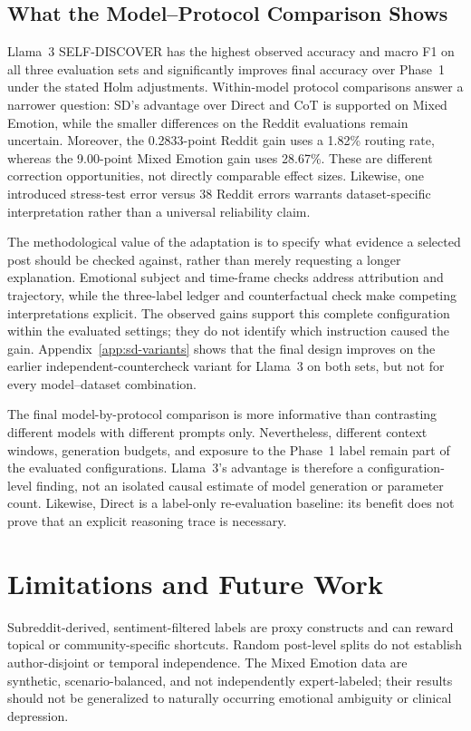 \documentclass{ieeeaccess}
\begin{document}
\subsection{What the Model--Protocol Comparison Shows}
Llama~3 SELF-DISCOVER has the highest observed accuracy and macro F1 on all three evaluation sets and significantly improves final accuracy over Phase~1 under the stated Holm adjustments. Within-model protocol comparisons answer a narrower question: SD's advantage over Direct and CoT is supported on Mixed Emotion, while the smaller differences on the Reddit evaluations remain uncertain. Moreover, the 0.2833-point Reddit gain uses a 1.82\% routing rate, whereas the 9.00-point Mixed Emotion gain uses 28.67\%. These are different correction opportunities, not directly comparable effect sizes. Likewise, one introduced stress-test error versus 38 Reddit errors warrants dataset-specific interpretation rather than a universal reliability claim.

The methodological value of the adaptation is to specify what evidence a selected post should be checked against, rather than merely requesting a longer explanation. Emotional subject and time-frame checks address attribution and trajectory, while the three-label ledger and counterfactual check make competing interpretations explicit. The observed gains support this complete configuration within the evaluated settings; they do not identify which instruction caused the gain. Appendix~\ref{app:sd-variants} shows that the final design improves on the earlier independent-countercheck variant for Llama~3 on both sets, but not for every model--dataset combination.

The final model-by-protocol comparison is more informative than contrasting different models with different prompts only. Nevertheless, different context windows, generation budgets, and exposure to the Phase~1 label remain part of the evaluated configurations. Llama~3's advantage is therefore a configuration-level finding, not an isolated causal estimate of model generation or parameter count. Likewise, Direct is a label-only re-evaluation baseline: its benefit does not prove that an explicit reasoning trace is necessary.

\section{Limitations and Future Work}
Subreddit-derived, sentiment-filtered labels are proxy constructs and can reward topical or community-specific shortcuts. Random post-level splits do not establish author-disjoint or temporal independence. The Mixed Emotion data are synthetic, scenario-balanced, and not independently expert-labeled; their results should not be generalized to naturally occurring emotional ambiguity or clinical depression.
\end{document}

